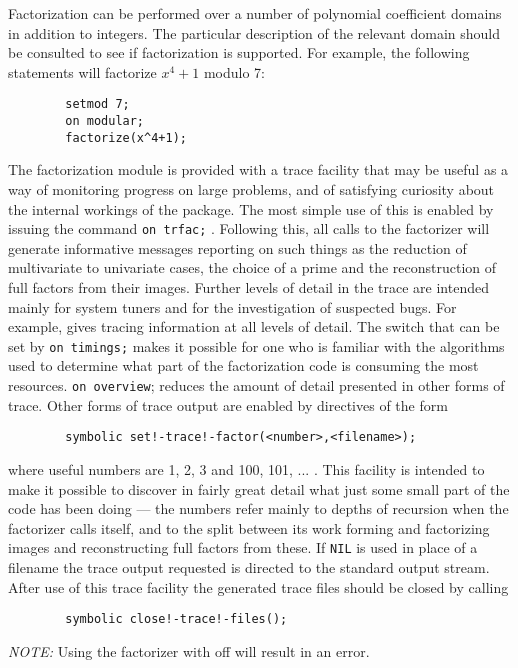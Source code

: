 Factorization can be performed over a number of polynomial coefficient
domains in addition to integers. The particular description of the relevant
domain should be consulted to see if factorization is supported. For
example, the following statements will factorize $x^{4}+1$ modulo 7:
\begin{verbatim}
        setmod 7;
        on modular;
        factorize(x^4+1);
\end{verbatim}
\hypertarget{switch:TRFAC}{}
The factorization module is provided with a trace facility that may be useful
as a way of monitoring progress on large problems, and of satisfying
curiosity about the internal workings of the package. The most simple use
of this is enabled by issuing the {\REDUCE} command
\texttt{on trfac;} .
Following this, all calls to the factorizer will generate informative
messages reporting on such things as the reduction of multivariate to
univariate cases, the choice of a prime and the reconstruction of full
factors from their images.  Further levels of detail in the trace are
intended mainly for system tuners and for the investigation of suspected
bugs.  For example,  gives tracing information at all levels
of detail.  The switch that can be set by \texttt{on timings;} makes it
possible for one who is familiar with the algorithms used to determine
what part of the factorization code is consuming the most resources.
\texttt{on overview}; reduces the amount of detail presented in other forms of
trace.  Other forms of trace output are enabled by directives of the form
\begin{verbatim}
        symbolic set!-trace!-factor(<number>,<filename>);
\end{verbatim}
where useful numbers are 1, 2, 3 and 100, 101, ... .  This facility is
intended to make it possible to discover in fairly great detail what just
some small part of the code has been doing --- the numbers refer mainly to
depths of recursion when the factorizer calls itself, and to the split
between its work forming and factorizing images and reconstructing full
factors from these.  If \texttt{NIL} is used in place of a filename the trace
output requested is directed to the standard output stream.  After use of
this trace facility the generated trace files should be closed by calling
\begin{verbatim}
        symbolic close!-trace!-files();
\end{verbatim}
\textit{NOTE:} Using the factorizer with  off will
result in an error.


